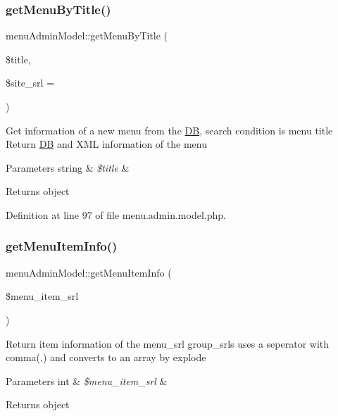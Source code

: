 \subsubsection{\texorpdfstring{get\+Menu\+By\+Title()}{getMenuByTitle()}}
{\footnotesize\ttfamily menu\+Admin\+Model\+::get\+Menu\+By\+Title (\begin{DoxyParamCaption}\item[{}]{\$title,  }\item[{}]{\$site\+\_\+srl = {} }\end{DoxyParamCaption})}

Get information of a new menu from the \hyperlink{classDB}{DB}, search condition is menu title Return \hyperlink{classDB}{DB} and X\+ML information of the menu 
\begin{DoxyParams}[1]{Parameters}
string & {\em \$title} & \\
\hline
\end{DoxyParams}
\begin{DoxyReturn}{Returns}
object 
\end{DoxyReturn}


Definition at line 97 of file menu.\+admin.\+model.\+php.

\hypertarget{classmenuAdminModel_a5686120035966f9a44ec2fea2af191e4}{}\label{classmenuAdminModel_a5686120035966f9a44ec2fea2af191e4} 
\subsubsection{\texorpdfstring{get\+Menu\+Item\+Info()}{getMenuItemInfo()}}
{\footnotesize\ttfamily menu\+Admin\+Model\+::get\+Menu\+Item\+Info (\begin{DoxyParamCaption}\item[{}]{\$menu\+\_\+item\+\_\+srl }\end{DoxyParamCaption})}

Return item information of the menu\+\_\+srl group\+\_\+srls uses a seperator with comma(,) and converts to an array by explode 
\begin{DoxyParams}[1]{Parameters}
int & {\em \$menu\+\_\+item\+\_\+srl} & \\
\hline
\end{DoxyParams}
\begin{DoxyReturn}{Returns}
object 
\end{DoxyReturn}


